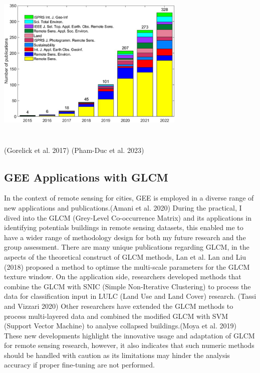 \documentclass[
  letterpaper,
  DIV=11,
  numbers=noendperiod]{scrreprt}
\begin{document}
\includegraphics[width=3.54167in,height=3.02083in]{images/wk6/12145_2023_1035_Fig6_HTML.png}

(Gorelick et al. 2017) (Pham-Duc et al. 2023)

\hypertarget{gee-applications-with-glcm}{%
\subsection*{GEE Applications with
GLCM}\label{gee-applications-with-glcm}}

In the context of remote sensing for cities, GEE is employed in a
diverse range of new applications and publications.(Amani et al. 2020)
During the practical, I dived into the GLCM (Grey-Level Co-occurrence
Matrix) and its applications in identifying potentials buildings in
remote sensing datasets, this enabled me to have a wider range of
methodology design for both my future research and the group assessment.
There are many unique publications regarding GLCM, in the aspects of the
theoretical construct of GLCM methods, Lan et al. Lan and Liu (2018)
proposed a method to optimse the multi-scale parameters for the GLCM
texture window. On the application side, researchers developed methods
that combine the GLCM with SNIC (Simple Non-Iterative Clustering) to
process the data for classification input in LULC (Land Use and Land
Cover) research. (Tassi and Vizzari 2020) Other researchers have
extended the GLCM methods to process multi-layered data and combined the
modified GLCM with SVM (Support Vector Machine) to analyse collapsed
buildings.(Moya et al. 2019) These new developments highlight the
innovative usage and adaptation of GLCM for remote sensing research,
however, it also indicates that such numeric methods should be handled
with caution as its limitations may hinder the analysis accuracy if
proper fine-tuning are not performed.
\end{document}

